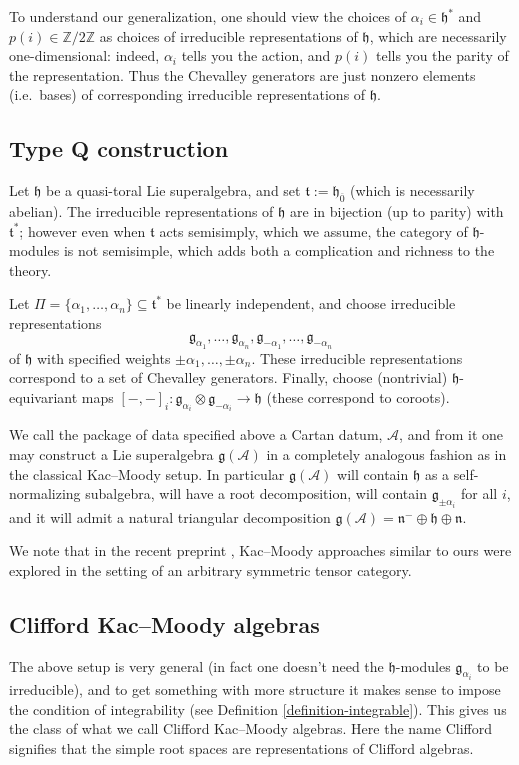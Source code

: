 \documentclass[12pt, a4paper, reqno]{amsart}
\def\Z{\mathbb{Z}}
\def\AA{\mathcal{A}}
\def\n{\mathfrak{n}}
\def\g{\mathfrak{g}}
\def\h{\mathfrak{h}}
\def\ol{\overline}
\theoremstyle{definition}
\theoremstyle{definition}
\theoremstyle{definition}
\numberwithin{theorem}{section}
\numberwithin{lemma}{section}
\numberwithin{remark}{section}
\numberwithin{definition}{section}
\numberwithin{corollary}{section}
\numberwithin{proposition}{section}
\numberwithin{example}{section}
\begin{document}
	To understand our generalization, one should view the choices of $\alpha_i\in\h^*$ and $p(i)\in\Z/2\Z$ as choices of irreducible representations of $\h$, which are necessarily one-dimensional: indeed, $\alpha_i$ tells you the action, and $p(i)$ tells you the parity of the representation.  Thus the Chevalley generators are just nonzero elements (i.e.~bases) of corresponding irreducible representations of $\h$.
	
	\subsection{Type Q construction} Let $\h$ be a quasi-toral Lie superalgebra, and set $\mathfrak{t}:=\h_{\ol{0}}$ (which is necessarily abelian).  The irreducible representations of $\h$ are in bijection (up to parity) with $\mathfrak{t}^*$; however even when $\mathfrak{t}$ acts semisimply, which we assume, the category of $\h$-modules is not semisimple, which adds both a complication and richness to the theory. 
	
	Let $\Pi=\{\alpha_1,\dots,\alpha_n\}\subseteq\mathfrak{t}^*$ be linearly independent, and choose irreducible representations 
	\[
	\g_{\alpha_1},\dots,\g_{\alpha_n},\g_{-\alpha_1},\dots,\g_{-\alpha_n}
	\] 
	of $\h$ with specified weights $\pm\alpha_1,\dots,\pm\alpha_n$.  These irreducible representations correspond to a set of Chevalley generators.  Finally, choose (nontrivial) $\h$-equivariant maps $[-,-]_{i}:\g_{\alpha_{i}}\otimes\g_{-\alpha_i}\to\h$ (these correspond to coroots).
	
	We call the package of data specified above a Cartan datum, $\AA$, and from it one may construct a Lie superalgebra $\g(\AA)$ in a completely analogous fashion as in the classical Kac--Moody setup.  In particular $\g(\AA)$ will contain $\h$ as a self-normalizing subalgebra, will have a root decomposition, will contain $\g_{\pm\alpha_i}$ for all $i$, and it will admit a natural triangular decomposition $\g(\AA)=\n^{-}\oplus\h\oplus\n$.
	
	We note that in the recent preprint \cite{APS}, Kac--Moody approaches similar to ours were explored in the setting of an arbitrary symmetric tensor category.
	
	\subsection{Clifford Kac--Moody algebras} The above setup is very general (in fact one doesn't need the $\h$-modules $\g_{\alpha_i}$ to be irreducible), and to get something with more structure it makes sense to impose the condition of integrability (see Definition \ref{definition-integrable}).  This gives us the class of what we call Clifford Kac--Moody algebras.  Here the name Clifford signifies that the simple root spaces are representations of Clifford algebras.  
	
\end{document}
